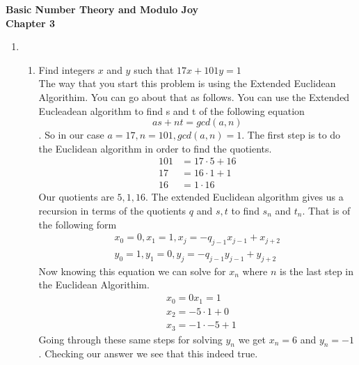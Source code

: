 \documentclass[12pt]{article}
\begin{document}
\begin{center}
    \textbf{Basic Number Theory and Modulo Joy\\
        Chapter 3}
\end{center}
\begin{enumerate}
    \item
          \begin{enumerate}

              \item Find integers $x$ and $y$ such that $17x+101y =1$\\
                    The way that you start this problem is using the Extended Euclidean Algorithim. You can go about that as follows.
                    You can use the Extended Eucleadean algorithm to find s and t of the following equation \[
                        as+nt = gcd(a,n)
                    \].
                    So in our case $a = 17 ,n =101, gcd(a,n)=1 $.
                    The first step is to do the Euclidean algorithm in order to find the quotients.
                    \begin{align*}
                        101 & = 17\cdot 5 + 16 \\
                        17  & = 16\cdot 1 +1   \\
                        16  & = 1\cdot 16
                    \end{align*}
                    Our quotients are $5,1,16$. The extended Euclidean algorithm gives us a recursion in terms of the quotients $q$ and $s , t$ to find $s_n$ and $t_n$. That is of the following form
                    \begin{align*}
                        x_0 =0, x_1=1,x_j = -q_{j-1}x_{j-1}+x_{j+2} \\
                        y_0 =1, y_1=0,y_j = -q_{j-1}y_{j-1}+y_{j+2}
                    \end{align*}
                    Now knowing this equation we can solve for $x_n$ where $n$ is the last step in the Euclidean Algorithim.
                    \begin{align*}
                         & x_0 = 0 x_1 =1        \\
                         & x_2 = -5 \cdot 1 + 0  \\
                         & x_3 = -1 \cdot -5 + 1
                    \end{align*}
                    Going through these same steps for solving $y_n$ we get $x_n=6$ and $y_n = -1$.
                    Checking our answer we see that this indeed true.

\end{enumerate}
\end{enumerate}
\end{document}
